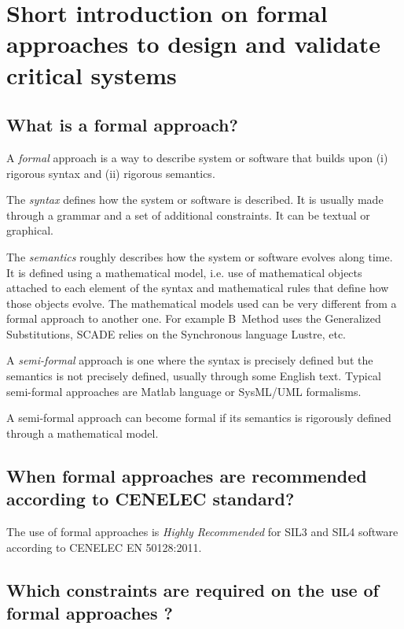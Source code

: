 

\section{Short introduction on formal approaches to  design and validate critical systems}

\subsection{What is a formal approach?}

A \emph{formal} approach is a way to describe system or software
that builds upon (i) rigorous syntax and (ii) rigorous semantics.

The \emph{syntax} defines how the system or software is described. It
is usually made through a grammar and a set of additional
constraints. It can be textual or graphical.

The \emph{semantics} roughly describes how the system or software
evolves along time. It is defined using a mathematical model, i.e. use
of mathematical objects attached to each element of the syntax and
mathematical rules that define how those objects evolve. The
mathematical models used can be very different from a formal approach
to another one. For example B~Method uses the Generalized
Substitutions, SCADE relies on the Synchronous language Lustre, etc.

A \emph{semi-formal} approach is one where the syntax is precisely
defined but the semantics is not precisely defined, usually through
some English text. Typical semi-formal approaches are Matlab language
or SysML/UML formalisms.

A semi-formal approach can become formal if its semantics is
rigorously defined through a mathematical model.

\subsection{When formal approaches are recommended according to CENELEC standard?}

The use of formal approaches is \emph{Highly Recommended} for SIL3 and
SIL4 software according to CENELEC EN 50128:2011.

\subsection{Which constraints are required on the use of formal  approaches ?}



